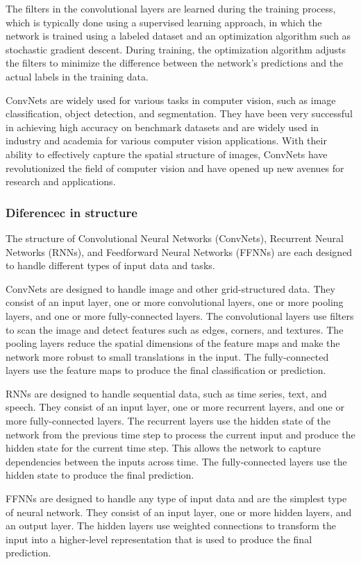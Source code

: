 \documentclass[12pt, a4paper, oneside]{article}
\begin{document}
The filters in the convolutional layers are learned during the training process, which is typically done using a supervised learning approach, in which the network is trained using a labeled dataset and an optimization algorithm such as stochastic gradient descent. During training, the optimization algorithm adjusts the filters to minimize the difference between the network's predictions and the actual labels in the training data.

ConvNets are widely used for various tasks in computer vision, such as image classification, object detection, and segmentation. They have been very successful in achieving high accuracy on benchmark datasets and are widely used in industry and academia for various computer vision applications. With their ability to effectively capture the spatial structure of images, ConvNets have revolutionized the field of computer vision and have opened up new avenues for research and applications.
\subsubsection{Diferencec in structure}
The structure of Convolutional Neural Networks (ConvNets), Recurrent Neural Networks (RNNs), and Feedforward Neural Networks (FFNNs) are each designed to handle different types of input data and tasks.

ConvNets are designed to handle image and other grid-structured data. They consist of an input layer, one or more convolutional layers, one or more pooling layers, and one or more fully-connected layers. The convolutional layers use filters to scan the image and detect features such as edges, corners, and textures. The pooling layers reduce the spatial dimensions of the feature maps and make the network more robust to small translations in the input. The fully-connected layers use the feature maps to produce the final classification or prediction.

RNNs are designed to handle sequential data, such as time series, text, and speech. They consist of an input layer, one or more recurrent layers, and one or more fully-connected layers. The recurrent layers use the hidden state of the network from the previous time step to process the current input and produce the hidden state for the current time step. This allows the network to capture dependencies between the inputs across time. The fully-connected layers use the hidden state to produce the final prediction.

FFNNs are designed to handle any type of input data and are the simplest type of neural network. They consist of an input layer, one or more hidden layers, and an output layer. The hidden layers use weighted connections to transform the input into a higher-level representation that is used to produce the final prediction.
\end{document}
